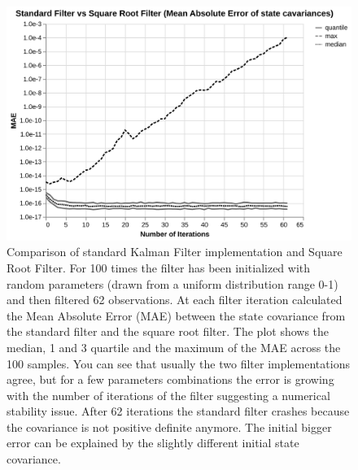 \documentclass{article}
\let\Oldsection\section
\renewcommand{\section}{\FloatBarrier\Oldsection}
\begin{document}
\begin{figure}
\includegraphics[width=\textwidth]{numerical_stability}
 \caption{Comparison of standard Kalman Filter implementation and Square Root Filter. For 100 times the filter has been initialized with random parameters (drawn from a uniform distribution range 0-1) and then filtered 62 observations. At each filter iteration calculated the Mean Absolute Error (MAE) between the state covariance from the standard filter and the square root filter. The plot shows the median, 1 and 3 quartile and the maximum of the MAE across the 100 samples. You can see that usually the two filter implementations agree, but for a few parameters combinations the error is growing with the number of iterations of the filter suggesting a numerical stability issue. After 62 iterations the standard filter crashes because the covariance is not positive definite anymore. The initial bigger error can be explained by the slightly different initial state covariance.}
\end{figure}


\end{document}
